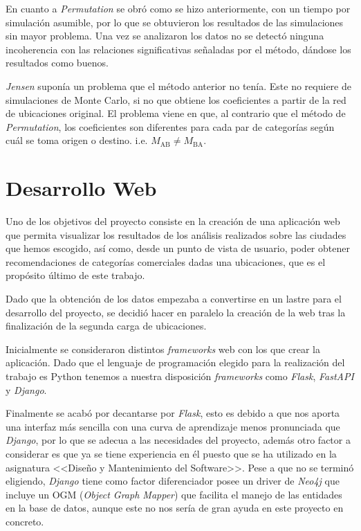En cuanto a \textit{Permutation} se obró como se hizo anteriormente, con un tiempo por simulación asumible, por lo que se obtuvieron los resultados de las simulaciones sin mayor problema. Una vez se analizaron los datos no se detectó ninguna incoherencia con las relaciones significativas señaladas por el método, dándose los resultados como buenos.

\textit{Jensen} suponía un problema que el método anterior no tenía. Este no requiere de simulaciones de Monte Carlo, si no que obtiene los coeficientes a partir de la red de ubicaciones original. El problema viene en que, al contrario que el método de \textit{Permutation}, los coeficientes son diferentes para cada par de categorías según cuál se toma origen o destino. i.e. $M_\text{AB} \neq M_\text{BA}$.



\section{Desarrollo Web}
Uno de los objetivos del proyecto consiste en la creación de una aplicación web que permita visualizar los resultados de los análisis realizados sobre las ciudades que hemos escogido, así como, desde un punto de vista de usuario, poder obtener recomendaciones de categorías comerciales dadas una ubicaciones, que es el propósito último de este trabajo.

Dado que la obtención de los datos empezaba a convertirse en un lastre para el desarrollo del proyecto, se decidió hacer en paralelo la creación de la web tras la finalización de la segunda carga de ubicaciones.

Inicialmente se consideraron distintos \textit{frameworks} web con los que crear la aplicación. Dado que el lenguaje de programación elegido para la realización del trabajo es Python tenemos a nuestra disposición \textit{frameworks} como \textit{Flask}, \textit{FastAPI} y \textit{Django}.

Finalmente se acabó por decantarse por \textit{Flask}, esto es debido a que nos aporta una interfaz más sencilla con una curva de aprendizaje menos pronunciada que \textit{Django}, por lo que se adecua a las necesidades del proyecto, además otro factor a considerar es que ya se tiene experiencia en él puesto que se ha utilizado en la asignatura <<Diseño y Mantenimiento del Software>>. Pese a que no se terminó eligiendo, \textit{Django} tiene como factor diferenciador posee un driver de \textit{Neo4j} que incluye un OGM (\textit{Object Graph Mapper}) que facilita el manejo de las entidades en la base de datos, aunque este no nos sería de gran ayuda en este proyecto en concreto.


